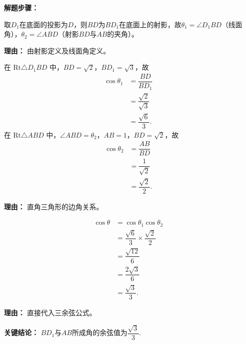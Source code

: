 \begin{examplebox}
	\textbf{\textcolor{CExample}{解题步骤：}}
	\begin{description}[style=nextline, leftmargin=2.8em, labelsep=0.5em, itemsep=0.45em]
		\item[\textbf{第一步（确定各角）：}] 取$D_1$在底面的投影为$D$，则$BD$为$BD_1$在底面上的射影，故$\theta_1 = \angle D_1BD$（线面角），$\theta_2 = \angle ABD$（射影$BD$与$AB$的夹角）。
			\par\textbf{理由：} 由射影定义及线面角定义。
		\item[\textbf{第二步（计算$\cos\theta_1$与$\cos\theta_2$）：}] \par
			在 $\mathrm{Rt}\triangle D_1BD$ 中，$BD = \sqrt{2}$，$BD_1 = \sqrt{3}$，故
			\[
				\begin{aligned}
					\cos\theta_1 &= \dfrac{BD}{BD_1} \\
					&= \dfrac{\sqrt{2}}{\sqrt{3}} \\
					&= \dfrac{\sqrt{6}}{3}.
			\end{aligned}
			\]
			在 $\mathrm{Rt}\triangle ABD$ 中，$\angle ABD = \theta_2$，$AB=1$，$BD=\sqrt{2}$，故
			\[
				\begin{aligned}
					\cos\theta_2 &= \dfrac{AB}{BD} \\
					&= \dfrac{1}{\sqrt{2}} \\
					&= \dfrac{\sqrt{2}}{2}.
			\end{aligned}
			\]
			\par\textbf{理由：} 直角三角形的边角关系。
		\item[\textbf{第三步（套用三余弦定理求$\theta$）：}] \par
			\[
				\begin{aligned}
					\cos\theta &= \cos\theta_1\cos\theta_2 \\
					&= \dfrac{\sqrt{6}}{3} \times \dfrac{\sqrt{2}}{2} \\
					&= \dfrac{\sqrt{12}}{6} \\
					&= \dfrac{2\sqrt{3}}{6} \\
					&= \dfrac{\sqrt{3}}{3}.
			\end{aligned}
			\]
			\par\textbf{理由：} 直接代入三余弦公式。
	\end{description}

	\textbf{\textcolor{CExample}{关键结论：}}
	$BD_1$与$AB$所成角的余弦值为$\dfrac{\sqrt{3}}{3}$.
\end{examplebox}
